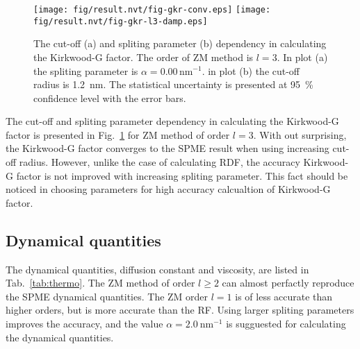 \documentclass[aip,jcp,a4paper,preprint,unsortedaddress,onecolumn,fleqn]{revtex4-1}
\begin{document}
\begin{figure}
  \centering
  \texttt{[image: fig/result.nvt/fig-gkr-conv.eps]}
  \texttt{[image: fig/result.nvt/fig-gkr-l3-damp.eps]} 
  \caption{
    The cut-off (a) and spliting parameter (b) dependency in calculating the Kirkwood-G factor.
    The order of ZM method is $l=3$. In plot (a) the spliting parameter is $\alpha = 0.00\,\textrm{nm}^{-1}$.
    in plot (b) the cut-off radius is 1.2~nm.
    The statistical uncertainty is presented at 95~\% confidence level with the  error bars.
  }
  \label{fig:gkr-conv}
\end{figure}

The cut-off and spliting parameter dependency in calculating the Kirkwood-G factor
is presented in Fig.~\ref{fig:gkr-conv}  for ZM method of order $l=3$. With out surprising,
the Kirkwood-G factor converges to the SPME result when using increasing cut-off radius. 
However, unlike the case of calculating RDF, the accuracy Kirkwood-G factor is not improved
with increasing spliting parameter. This fact should be noticed in choosing parameters for
high accuracy calcualtion of Kirkwood-G factor.

\subsection{Dynamical quantities}

The dynamical quantities, diffusion constant and viscosity, are listed in Tab.~\ref{tab:thermo}.
The ZM method of order $l\geq 2$ can almost perfactly reproduce the SPME dynamical quantities.
The ZM order $l=1$ is of less accurate than higher orders, but is more accurate than the RF.
Using larger spliting parameters improves the accuracy, and the value $\alpha= 2.0\ \textrm{nm}^{-1}$ is
sugguested for calculating the dynamical quantities.


\end{document}
